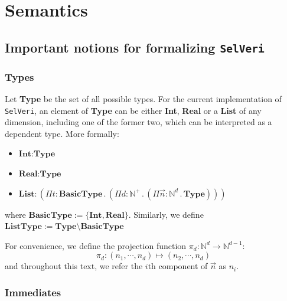 \documentclass{article}
\begin{document}
\newpage
\section{Semantics}

\subsection{Important notions for formalizing \texttt{SelVeri}}

\subsubsection{Types}

Let \textbf{Type} be the set of all possible types. For the current implementation of \texttt{SelVeri}, an element of \textbf{Type} can be either \textbf{Int}, \textbf{Real} or a \textbf{List} of any dimension, including one of the former two, which can be interpreted as a dependent type. More formally:
\begin{itemize}
    \item $\textbf{Int} : \textbf{Type}$ 
    \item $\textbf{Real} : \textbf{Type}$ 
    \item $ \textbf{List}: (\Pi{t} : \textbf{BasicType} \, . \,  (\Pi{d} : \textbf{$\mathbb{N}^+$} \, . \,  (\Pi{\vec{n}} : \textbf{$\mathbb{N}^d$} \, . \,  \textbf{Type})))$
\end{itemize} where $\textbf{BasicType} := \{\textbf{Int}, \textbf{Real}\}$. Similarly, we define $\textbf{ListType} := \textbf{Type} \setminus \textbf{BasicType}$ 

For convenience, we define the projection function $\pi_d: \mathbb{N}^d \to \mathbb{N}^{d-1}$:
\[
\pi_d: (n_1,\cdots,n_d) \mapsto (n_2,\cdots,n_d)
\]
and throughout this text, we refer the $i$th component of $\vec{n}$ as $n_i$.

\subsubsection{Immediates}
\end{document}
